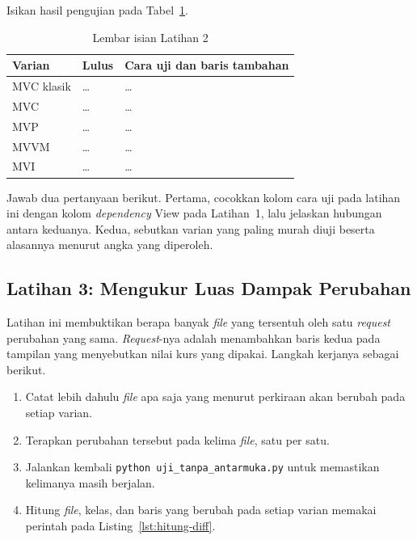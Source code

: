 Isikan hasil pengujian pada Tabel~\ref{tab:lat2mv-hasil}.

\begin{table}[htbp]
  \centering
  \caption{Lembar isian Latihan 2}
  \label{tab:lat2mv-hasil}
  \begin{tabularx}{\textwidth}{|l|l|X|}
    \hline
    \textbf{Varian} & \textbf{Lulus} & \textbf{Cara uji dan baris tambahan} \\
    \hline
    MVC klasik & \dots & \dots \\
    \hline
    MVC & \dots & \dots \\
    \hline
    MVP & \dots & \dots \\
    \hline
    MVVM & \dots & \dots \\
    \hline
    MVI & \dots & \dots \\
    \hline
  \end{tabularx}
\end{table}

Jawab dua pertanyaan berikut. Pertama, cocokkan kolom cara uji pada latihan ini
dengan kolom \textit{dependency} View pada Latihan~1, lalu jelaskan hubungan antara
keduanya. Kedua, sebutkan varian yang paling murah diuji beserta alasannya
menurut angka yang diperoleh.

\subsection*{Latihan 3: Mengukur Luas Dampak Perubahan}

Latihan ini membuktikan berapa banyak \textit{file} yang tersentuh oleh satu \textit{request}
perubahan yang sama. \textit{Request}-nya adalah menambahkan baris kedua pada tampilan
yang menyebutkan nilai kurs yang dipakai. Langkah kerjanya sebagai berikut.

\begin{enumerate}
  \item Catat lebih dahulu \textit{file} apa saja yang menurut perkiraan akan berubah
    pada setiap varian.
  \item Terapkan perubahan tersebut pada kelima \textit{file}, satu per satu.
  \item Jalankan kembali \texttt{python uji\_tanpa\_antarmuka.py} untuk
    memastikan kelimanya masih berjalan.
  \item Hitung \textit{file}, kelas, dan baris yang berubah pada setiap varian memakai
    perintah pada Listing~\ref{lst:hitung-diff}.
\end{enumerate}

